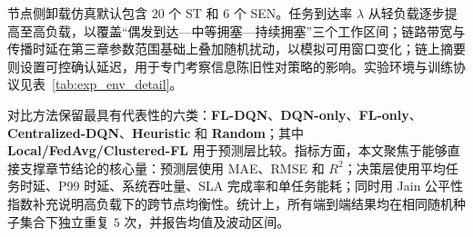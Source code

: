 节点侧卸载仿真默认包含 $20$ 个 ST 和 $6$ 个 SEN。任务到达率 $\lambda$ 从轻负载逐步提高至高负载，以覆盖“偶发到达—中等拥塞—持续拥塞”三个工作区间；链路带宽与传播时延在第三章参数范围基础上叠加随机扰动，以模拟可用窗口变化；链上摘要则设置可控确认延迟，用于专门考察信息陈旧性对策略的影响。实验环境与训练协议见表~\ref{tab:exp_env_detail}。

\begin{table}[H]
\centering
\footnotesize
\caption{预测层与决策层实验环境配置}
\label{tab:exp_env_detail}
\setlength{\tabcolsep}{1.8mm}
\renewcommand{\arraystretch}{1.15}
\end{table}

对比方法保留最具有代表性的六类：\textbf{FL-DQN}、\textbf{DQN-only}、\textbf{FL-only}、\textbf{Centralized-DQN}、\textbf{Heuristic} 和 \textbf{Random}；其中 \textbf{Local/FedAvg/Clustered-FL} 用于预测层比较。指标方面，本文聚焦于能够直接支撑章节结论的核心量：预测层使用 MAE、RMSE 和 $R^2$；决策层使用平均任务时延、P99 时延、系统吞吐量、SLA 完成率和单任务能耗；同时用 Jain 公平性指数补充说明高负载下的跨节点均衡性。统计上，所有端到端结果均在相同随机种子集合下独立重复 $5$ 次，并报告均值及波动区间。

